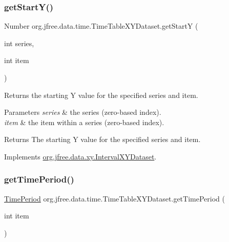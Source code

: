 \subsubsection{\texorpdfstring{get\+Start\+Y()}{getStartY()}}
{\footnotesize\ttfamily Number org.\+jfree.\+data.\+time.\+Time\+Table\+X\+Y\+Dataset.\+get\+StartY (\begin{DoxyParamCaption}\item[{int}]{series,  }\item[{int}]{item }\end{DoxyParamCaption})}

Returns the starting Y value for the specified series and item.


\begin{DoxyParams}{Parameters}
{\em series} & the series (zero-\/based index). \\
\hline
{\em item} & the item within a series (zero-\/based index).\\
\hline
\end{DoxyParams}
\begin{DoxyReturn}{Returns}
The starting Y value for the specified series and item. 
\end{DoxyReturn}


Implements \mbox{\hyperlink{interfaceorg_1_1jfree_1_1data_1_1xy_1_1_interval_x_y_dataset_afdd414735adb233734bc35b76a005ed9}{org.\+jfree.\+data.\+xy.\+Interval\+X\+Y\+Dataset}}.

\mbox{\label{classorg_1_1jfree_1_1data_1_1time_1_1_time_table_x_y_dataset_add6786f453d98f7a24ab89a5c9e65e7d}} 
\subsubsection{\texorpdfstring{get\+Time\+Period()}{getTimePeriod()}}
{\footnotesize\ttfamily \mbox{\hyperlink{interfaceorg_1_1jfree_1_1data_1_1time_1_1_time_period}{Time\+Period}} org.\+jfree.\+data.\+time.\+Time\+Table\+X\+Y\+Dataset.\+get\+Time\+Period (\begin{DoxyParamCaption}\item[{int}]{item }\end{DoxyParamCaption})}

